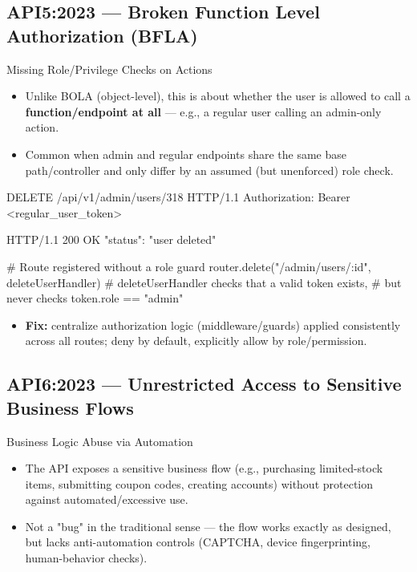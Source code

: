 \documentclass[11pt]{article}
\begin{document}
\subsection{API5:2023 --- Broken Function Level Authorization (BFLA)}
\begin{vulnbox}{Missing Role/Privilege Checks on Actions}
\begin{itemize}
  \item Unlike BOLA (object-level), this is about whether the user is allowed to call a \textbf{function/endpoint at all} --- e.g., a regular user calling an admin-only action.
  \item Common when admin and regular endpoints share the same base path/controller and only differ by an assumed (but unenforced) role check.
\end{itemize}
\end{vulnbox}

\begin{httpbox}
DELETE /api/v1/admin/users/318 HTTP/1.1
Authorization: Bearer <regular_user_token>

HTTP/1.1 200 OK
{ "status": "user deleted" }
\end{httpbox}

\begin{pseudobox}
# Route registered without a role guard
router.delete("/admin/users/:id", deleteUserHandler)
# deleteUserHandler checks that a valid token exists,
# but never checks token.role == "admin"
\end{pseudobox}

\begin{itemize}
  \item \textbf{Fix:} centralize authorization logic (middleware/guards) applied consistently across all routes; deny by default, explicitly allow by role/permission.
\end{itemize}

\subsection{API6:2023 --- Unrestricted Access to Sensitive Business Flows}
\begin{vulnbox}{Business Logic Abuse via Automation}
\begin{itemize}
  \item The API exposes a sensitive business flow (e.g., purchasing limited-stock items, submitting coupon codes, creating accounts) without protection against automated/excessive use.
  \item Not a "bug" in the traditional sense --- the flow works exactly as designed, but lacks anti-automation controls (CAPTCHA, device fingerprinting, human-behavior checks).
\end{itemize}
\end{vulnbox}
\end{document}
